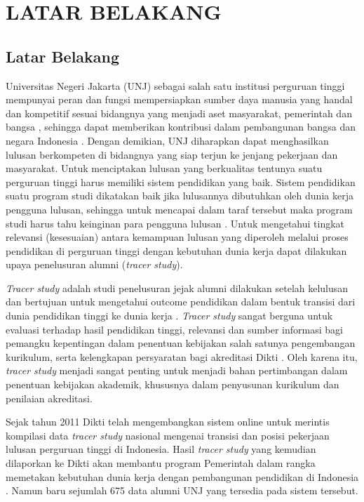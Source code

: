 
\chapter{LATAR BELAKANG}

\section{Latar Belakang}
Universitas Negeri Jakarta (UNJ) sebagai salah satu institusi perguruan tinggi mempunyai peran dan fungsi mempersiapkan sumber daya manusia yang handal dan kompetitif sesuai bidangnya yang menjadi aset masyarakat, pemerintah dan bangsa , sehingga dapat memberikan kontribusi dalam pembangunan bangsa dan negara Indonesia \cite{BPAFMIPA}. Dengan demikian, UNJ diharapkan dapat menghasilkan lulusan berkompeten di bidangnya yang siap terjun ke jenjang pekerjaan dan masyarakat. Untuk menciptakan lulusan yang berkualitas tentunya suatu perguruan tinggi harus memiliki sistem pendidikan yang baik. Sistem pendidikan suatu program studi dikatakan baik jika lulusannya dibutuhkan oleh dunia kerja pengguna lulusan, sehingga untuk mencapai dalam taraf tersebut maka program studi harus tahu keinginan para pengguna lulusan \cite{EkoNursubiyantoro}. Untuk mengetahui tingkat relevansi (kesesuaian) antara kemampuan lulusan yang diperoleh melalui proses pendidikan di perguruan tinggi dengan kebutuhan dunia kerja dapat dilakukan upaya penelusuran alumni (\textit{tracer study}).

\textit{Tracer study} adalah studi penelusuran jejak alumni dilakukan setelah kelulusan dan bertujuan untuk mengetahui outcome pendidikan dalam bentuk transisi dari dunia pendidikan tinggi ke dunia kerja \cite{ExploringTS}. \textit{Tracer study} sangat berguna untuk evaluasi terhadap hasil pendidikan tinggi, relevansi dan sumber informasi bagi pemangku kepentingan dalam penentuan kebijakan salah satunya pengembangan kurikulum, serta kelengkapan persyaratan bagi akreditasi Dikti \cite{RistekdiktiPanduan}. Oleh karena itu, \textit{tracer study} menjadi sangat penting untuk menjadi bahan pertimbangan dalam penentuan kebijakan akademik, khususnya dalam penyusunan kurikulum dan penilaian akreditasi.

Sejak tahun 2011 Dikti telah mengembangkan sistem online untuk merintis kompilasi data \textit{tracer study} nasional mengenai transisi dan posisi pekerjaan lulusan perguruan tinggi di Indonesia. Hasil \textit{tracer study} yang kemudian dilaporkan ke Dikti akan membantu program Pemerintah dalam rangka memetakan kebutuhan dunia kerja dengan pembangunan pendidikan di Indonesia \cite{RistekdiktiWeb}. Namun baru sejumlah 675 data alumni UNJ yang tersedia pada sistem tersebut.

